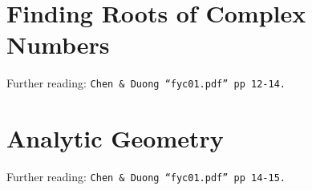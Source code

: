 \section{Finding Roots of Complex Numbers}
\label{sec:dMT Finding Roots of Complex Numbers}
Further reading: \texttt{Chen \& Duong ``fyc01.pdf'' pp 12-14.}

\section{Analytic Geometry}
\label{sec:dMT Analytic Geometry}
Further reading: \texttt{Chen \& Duong ``fyc01.pdf'' pp 14-15.}